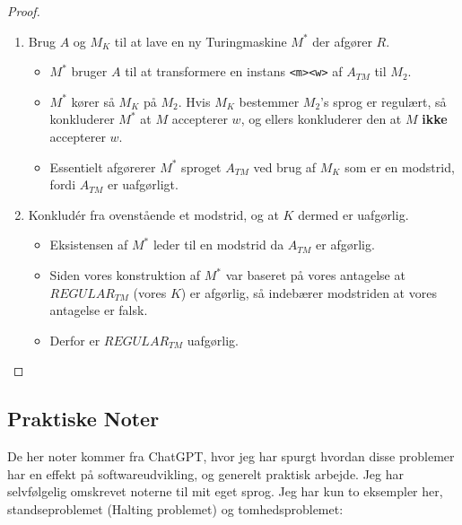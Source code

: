\begin{proof}
\begin{enumerate}
		\item Brug $A$ og $M_{K}$ til at lave en ny Turingmaskine $M^{*}$ der afgører $R$.
		      \begin{itemize}
			      \item $M^{*}$ bruger $A$ til at transformere en instans \texttt{<m><w>} af $A_{TM}$ til $M_{2}$.
			      \item $M^{*}$ kører så $M_{K}$ på $M_{2}$. Hvis $M_{K}$ bestemmer $M_{2}$'s sprog er regulært, så konkluderer $M^{*}$ at $M$ accepterer $w$, og ellers konkluderer den at $M$ \textbf{ikke} accepterer $w$.
			      \item Essentielt afgørerer $M^{*}$ sproget $A_{TM}$ ved brug af $M_{K}$ som er en modstrid, fordi $A_{TM}$ er uafgørligt.
		      \end{itemize}
		\item Konkludér fra ovenstående et modstrid, og at $K$ dermed er uafgørlig.
		      \begin{itemize}
			      \item Eksistensen af $M^{*}$ leder til en modstrid da $A_{TM}$ er afgørlig.
			      \item Siden vores konstruktion af $M^{*}$ var baseret på vores antagelse at $REGULAR_{TM}$ (vores $K$) er afgørlig, så indebærer modstriden at vores antagelse er falsk.
			      \item Derfor er $REGULAR_{TM}$ uafgørlig.
		      \end{itemize}
	\end{enumerate}


\end{proof}

\subsection{Praktiske Noter}%
\label{subsec:uafgørlighedpraktik}

De her noter kommer fra ChatGPT, hvor jeg har spurgt hvordan disse problemer har en effekt på softwareudvikling, og generelt praktisk arbejde. Jeg har selvfølgelig omskrevet noterne til mit eget sprog. Jeg har kun to eksempler her, standseproblemet (Halting problemet) og tomhedsproblemet:


